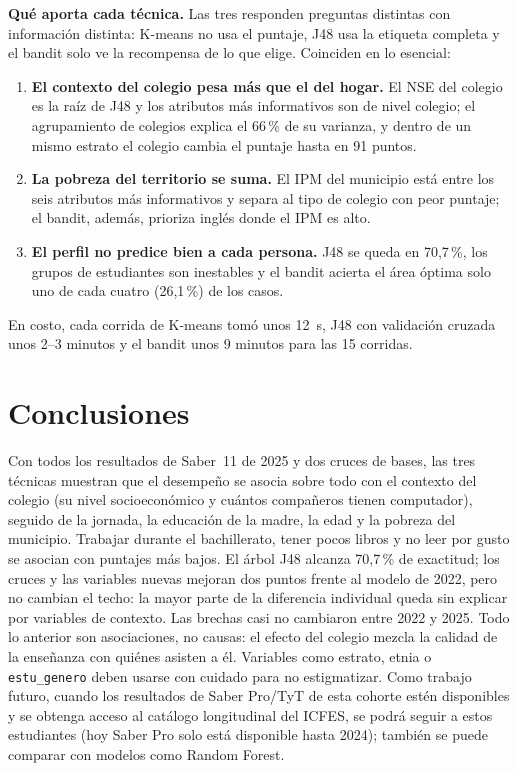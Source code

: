 \documentclass[conference]{IEEEtran}
\begin{document}
\textbf{Qué aporta cada técnica.} Las tres responden preguntas distintas con información distinta: K-means no usa el puntaje, J48 usa la etiqueta completa y el bandit solo ve la recompensa de lo que elige. Coinciden en lo esencial:
\begin{enumerate}
\item \textbf{El contexto del colegio pesa más que el del hogar.} El NSE del colegio es la raíz de J48 y los atributos más informativos son de nivel colegio; el agrupamiento de colegios explica el 66\,\% de su varianza, y dentro de un mismo estrato el colegio cambia el puntaje hasta en 91 puntos.
\item \textbf{La pobreza del territorio se suma.} El IPM del municipio está entre los seis atributos más informativos y separa al tipo de colegio con peor puntaje; el bandit, además, prioriza inglés donde el IPM es alto.
\item \textbf{El perfil no predice bien a cada persona.} J48 se queda en 70,7\,\%, los grupos de estudiantes son inestables y el bandit acierta el área óptima solo uno de cada cuatro (26,1\,\%) de los casos.
\end{enumerate}
En costo, cada corrida de K-means tomó unos 12~s, J48 con validación cruzada unos 2--3 minutos y el bandit unos 9 minutos para las 15 corridas.

\section{Conclusiones}
Con todos los resultados de Saber~11 de 2025 y dos cruces de bases, las tres técnicas muestran que el desempeño se asocia sobre todo con el contexto del colegio (su nivel socioeconómico y cuántos compañeros tienen computador), seguido de la jornada, la educación de la madre, la edad y la pobreza del municipio. Trabajar durante el bachillerato, tener pocos libros y no leer por gusto se asocian con puntajes más bajos. El árbol J48 alcanza 70,7\,\% de exactitud; los cruces y las variables nuevas mejoran dos puntos frente al modelo de 2022, pero no cambian el techo: la mayor parte de la diferencia individual queda sin explicar por variables de contexto. Las brechas casi no cambiaron entre 2022 y 2025. Todo lo anterior son asociaciones, no causas: el efecto del colegio mezcla la calidad de la enseñanza con quiénes asisten a él. Variables como estrato, etnia o \texttt{estu\_genero} deben usarse con cuidado para no estigmatizar. Como trabajo futuro, cuando los resultados de Saber Pro/TyT de esta cohorte estén disponibles y se obtenga acceso al catálogo longitudinal del ICFES, se podrá seguir a estos estudiantes (hoy Saber Pro solo está disponible hasta 2024); también se puede comparar con modelos como Random Forest.
\end{document}
